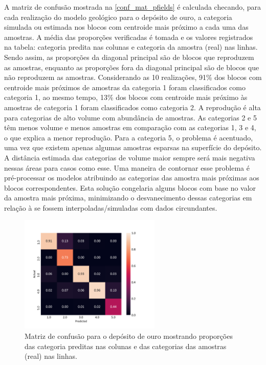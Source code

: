 A matriz de confusão mostrada na \autoref{conf_mat_pfields} é calculada checando, para cada realização do modelo geológico para o depósito de ouro, a categoria simulada ou estimada nos blocos com centroide mais próximo a cada uma das amostras. A média das proporções verificadas é tomada e os valores registrados na tabela: categoria predita nas colunas e categoria da amostra (real) nas linhas. Sendo assim, as proporções da diagonal principal são de blocos que reproduzem as amostras, enquanto as proporções fora da diagonal principal são de blocos que não reproduzem as amostras. Considerando as 10 realizações, 91\% dos blocos com centroide mais próximos de amostras da categoria 1 foram classificados como categoria 1, ao mesmo tempo, 13\% dos blocos com centroide mais próximo às amostras de categoria 1 foram classificados como categoria 2. A reprodução é alta para categorias de alto volume com abundância de amostras. As categorias 2 e 5 têm menos volume e menos amostras em comparação com as categorias 1, 3 e 4, o que explica a menor reprodução. Para a categoria 5, o problema é acentuado, uma vez que existem apenas algumas amostras esparsas na superfície do depósito. A distância estimada das categorias de volume maior sempre será mais negativa nessas áreas para casos como esse. Uma maneira de contornar esse problema é pré-processar os modelos atribuindo as categorias das amostra mais próximas aos blocos correspondentes. Esta solução congelaria alguns blocos com base no valor da amostra mais próxima, minimizando o desvanecimento dessas categorias em relação à se fossem interpoladas/simuladas com dados circundantes.

\begin{figure}[H]
	\caption{\label{conf_mat_pfields} Matriz de confusão para o depósito de ouro mostrando proporções das categoria preditas nas colunas e das categorias das amostras (real) nas linhas.}
	\centering
		\includegraphics[width=0.6\textwidth]{capitulo_3/imagens/backflag.png}
\end{figure}

